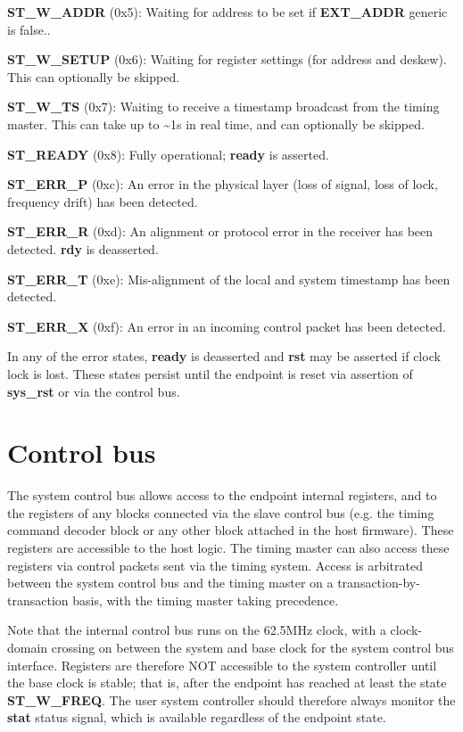 \documentclass{article}
\begin{document}
\textbf{ST\_W\_ADDR} (0x5): Waiting for address to be set if \textbf{EXT\_ADDR} generic is false..

\textbf{ST\_W\_SETUP} (0x6): Waiting for register settings (for address and deskew). This can optionally be skipped.

\textbf{ST\_W\_TS} (0x7): Waiting to receive a timestamp broadcast from the timing master. This can take up to \textasciitilde{}1s in real time, and can optionally be skipped.

\textbf{ST\_READY} (0x8): Fully operational; \textbf{ready} is asserted.

\textbf{ST\_ERR\_P} (0xc): An error in the physical layer (loss of signal, loss of lock, frequency drift) has been detected.

\textbf{ST\_ERR\_R} (0xd): An alignment or protocol error in the receiver has been detected. \textbf{rdy} is deasserted.

\textbf{ST\_ERR\_T} (0xe): Mis-alignment of the local and system timestamp has been detected.

\textbf{ST\_ERR\_X} (0xf): An error in an incoming control packet has been detected.

In any of the error states, \textbf{ready} is deasserted and \textbf{rst} may be asserted if clock lock is lost. These states persist until the endpoint is reset via assertion of \textbf{sys\_rst} or via the control bus.

\section{Control bus}

The system control bus allows access to the endpoint internal
registers, and to the registers of any blocks connected via the slave
control bus (e.g. the timing command decoder block or any other block
attached in the host firmware). These registers are accessible to the
host logic. The timing master can also access these registers via
control packets sent via the timing system. Access is arbitrated
between the system control bus and the timing master on a
transaction-by-transaction basis, with the timing master taking
precedence.

Note that the internal control bus runs on the 62.5MHz clock, with a
clock-domain crossing on between the system and base clock for the
system control bus interface. Registers are therefore NOT accessible
to the system controller until the base clock is stable; that is,
after the endpoint has reached at least the state
\textbf{ST\_W\_FREQ}. The user system controller should therefore
always monitor the \textbf{stat} status signal, which is available
regardless of the endpoint state.
\end{document}
